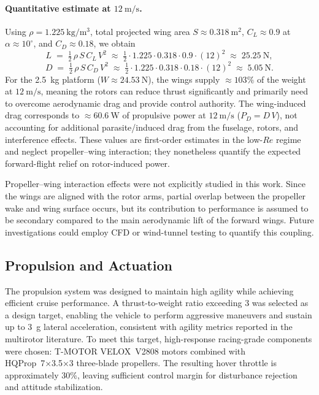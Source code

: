 \paragraph{Quantitative estimate at \(12~\mathrm{m/s}\).}
Using \(\rho=1.225~\mathrm{kg/m^3}\), total projected wing area \(S \approx 0.318~\mathrm{m^2}\), \(C_L \approx 0.9\) at \(\alpha \approx 10^\circ\), and \(C_D \approx 0.18\), we obtain
\[
L \;=\; \tfrac{1}{2}\,\rho\,S\,C_L\,V^2
\;\approx\; \tfrac{1}{2}\cdot 1.225 \cdot 0.318 \cdot 0.9 \cdot (12)^2
\;\approx\; 25.25~\mathrm{N},
\]
\[
D \;=\; \tfrac{1}{2}\,\rho\,S\,C_D\,V^2
\;\approx\; \tfrac{1}{2}\cdot 1.225 \cdot 0.318 \cdot 0.18 \cdot (12)^2
\;\approx\; 5.05~\mathrm{N}.
\]
For the \SI{2.5}{kg} platform (\(W \approx 24.53~\mathrm{N}\)), the wings supply \(\approx 103\%\) of the weight at \(12~\mathrm{m/s}\), meaning the rotors can reduce thrust significantly and primarily need to overcome aerodynamic drag and provide control authority. The wing-induced drag corresponds to \(\approx 60.6~\mathrm{W}\) of propulsive power at \(12~\mathrm{m/s}\) (\(P_D = D\,V\)), not accounting for additional parasite/induced drag from the fuselage, rotors, and interference effects. These values are first-order estimates in the low-\(Re\) regime and neglect propeller–wing interaction; they nonetheless quantify the expected forward-flight relief on rotor-induced power.

Propeller–wing interaction effects were not explicitly studied in this work.  
Since the wings are aligned with the rotor arms, partial overlap between the propeller wake and wing surface occurs, but its contribution to performance is assumed to be secondary compared to the main aerodynamic lift of the forward wings.  
Future investigations could employ CFD or wind-tunnel testing to quantify this coupling.

\subsection{Propulsion and Actuation}

The propulsion system was designed to maintain high agility while achieving efficient cruise performance.  
A thrust-to-weight ratio exceeding 3 was selected as a design target, enabling the vehicle to perform aggressive maneuvers and sustain up to \SI{3}{g} lateral acceleration, consistent with agility metrics reported in the multirotor literature.  
To meet this target, high-response racing-grade components were chosen:  
T-MOTOR VELOX~V2808 motors combined with HQProp~7×3.5×3 three-blade propellers.  
The resulting hover throttle is approximately 30\%, leaving sufficient control margin for disturbance rejection and attitude stabilization.

